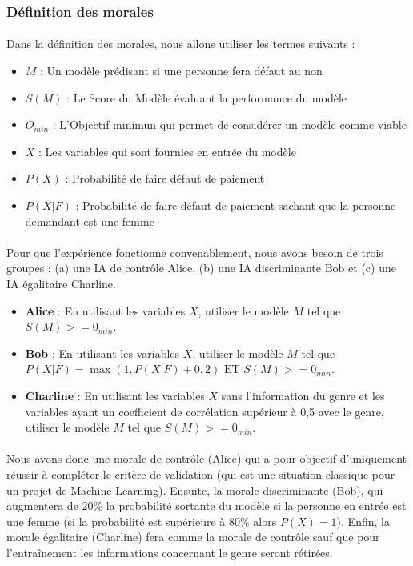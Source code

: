 \documentclass[10pt, french, a4paper]{report}
\begin{document}
\subsubsection{Définition des morales}

\paragraph{}
Dans la définition des morales, nous allons utiliser les termes suivants :

\begin{itemize}
  \item $M$ : Un modèle prédisant si une personne fera défaut au non
  \item $S(M)$ : Le Score du Modèle évaluant la performance du modèle
  \item $O_{min}$ : L'Objectif minimun qui permet de considérer un modèle comme viable
  \item $X$ : Les variables qui sont fournies en entrée du modèle
  \item $P(X)$ : Probabilité de faire défaut de paiement
  \item $P(X | F)$ : Probabilité de faire défaut de paiement sachant que la personne demandant est une femme
\end{itemize}

\paragraph{}
Pour que l'expérience fonctionne convenablement, nous avons besoin de trois groupes : (a) une IA de contrôle Alice, (b) une IA discriminante Bob et (c) une IA égalitaire Charline.

\begin{itemize}
  \item \textbf{Alice} : En utilisant les variables $X$, utiliser le modèle $M$ tel que $S(M) >= 0_{min}$.
  \item \textbf{Bob} :  En utilisant les variables $X$, utiliser le modèle $M$ tel que $P(X|F) = \max(1, P(X|F) + 0,2) \text{ ET } S(M) >= 0_{min}$.
  \item \textbf{Charline} : En utilisant les variables $X$ sans l'information du genre et les variables ayant un coefficient de corrélation supérieur à 0,5 avec le genre, utiliser le modèle $M$ tel que $S(M) >= 0_{min}$.
\end{itemize}

\paragraph{}
Nous avons donc une morale de contrôle (Alice) qui a pour objectif d'uniquement réussir à compléter le critère de validation (qui est une situation classique pour un projet de Machine Learning). Ensuite, la morale discriminante (Bob), qui augmentera de 20\% la probabilité sortante du modèle si la personne en entrée est une femme (si la probabilité est supérieure à 80\% alors $P(X) = 1$). Enfin, la morale égalitaire (Charline) fera comme la morale de contrôle sauf que pour l'entraînement les informations concernant le genre seront rétirées.
\end{document}
